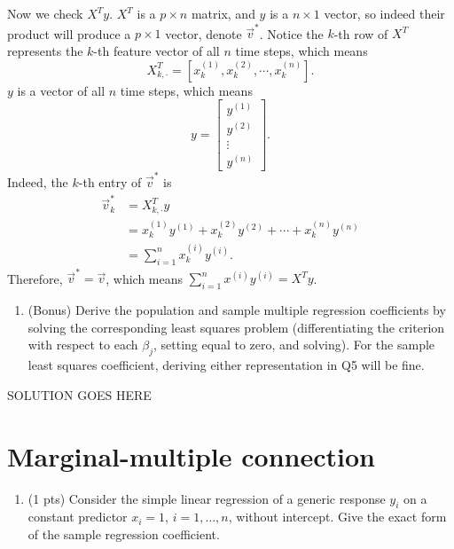 \documentclass[
]{article}
\providecommand{\tightlist}{%
  \setlength{\itemsep}{0pt}\setlength{\parskip}{0pt}}
\begin{document}
Now we check \(X^Ty\). \(X^T\) is a \(p\times n\) matrix, and \(y\) is a
\(n\times 1\) vector, so indeed their product will produce a
\(p\times 1\) vector, denote \(\vec{v}^*\). Notice the \(k\)-th row of
\(X^T\) represents the \(k\)-th feature vector of all \(n\) time steps,
which means
\[X^T_{k,\cdot} = \left[x_k^{(1)}, x_k^{(2)}, \cdots, x_k^{(n)}\right].\]
\(y\) is a vector of all \(n\) time steps, which means
\[y = \begin{bmatrix}
    y^{(1)} \\
    y^{(2)} \\
    \vdots \\
    y^{(n)}
  \end{bmatrix}.\] Indeed, the \(k\)-th entry of \(\vec{v}^*\) is
\begin{align*}
    \vec{v}^*_k & = X^T_{k,\cdot}y \\
    & = x_k^{(1)}y^{(1)} + x_k^{(2)}y^{(2)} + \cdots + x_k^{(n)}y^{(n)} \\
    & = \sum_{i=1}^{n}x_k^{(i)}y^{(i)}.
\end{align*} Therefore, \(\vec{v}^* = \vec{v}\), which means
\(\sum_{i=1}^{n}x^{(i)}y^{(i)} = X^Ty\).

\begin{enumerate}
\def\labelenumi{\arabic{enumi}.}
\setcounter{enumi}{5}
\tightlist
\item
  (Bonus) Derive the population and sample multiple regression
  coefficients by solving the corresponding least squares problem
  (differentiating the criterion with respect to each \(\beta_j\),
  setting equal to zero, and solving). For the sample least squares
  coefficient, deriving either representation in Q5 will be fine.
\end{enumerate}

SOLUTION GOES HERE

\hypertarget{marginal-multiple-connection}{%
\section{Marginal-multiple
connection}\label{marginal-multiple-connection}}

\begin{enumerate}
\def\labelenumi{\arabic{enumi}.}
\setcounter{enumi}{6}
\tightlist
\item
  (1 pts) Consider the simple linear regression of a generic response
  \(y_i\) on a constant predictor \(x_i = 1\), \(i = 1,\dots,n\),
  without intercept. Give the exact form of the sample regression
  coefficient.
\end{enumerate}
\end{document}
